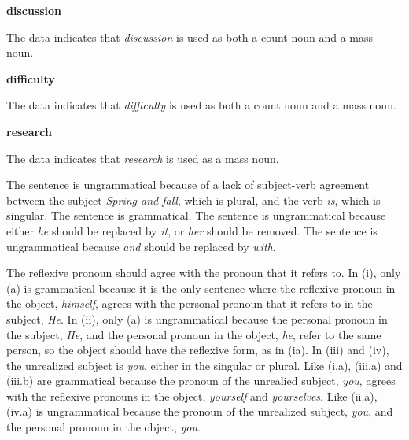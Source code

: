 \documentclass{article}
\begin{document}
\textbf{discussion}
\begin{exe}
\end{exe}
The data indicates that \textit{discussion} is used as both a count noun and a mass noun.

\textbf{difficulty}
\begin{exe}
\end{exe}
The data indicates that \textit{difficulty} is used as both a count noun and a mass noun.

\textbf{research}
\begin{exe}
\end{exe}
The data indicates that \textit{research} is used as a mass noun.
\clearpage

The sentence is ungrammatical because of a lack of subject-verb agreement between the subject \textit{Spring and fall}, which is plural, and the verb \textit{is},  which is singular.
The sentence is grammatical.
The sentence is ungrammatical because either \textit{he} should be replaced by \textit{it}, or \textit{her} should be removed.
The sentence is ungrammatical because \textit{and} should be replaced by \textit{with}.
\clearpage

The reflexive pronoun should agree with the pronoun that it refers to. In (i), only (a) is grammatical because it is the only sentence where the reflexive pronoun in the object, \textit{himself}, agrees with the personal pronoun that it refers to in the subject, \textit{He}. In (ii), only (a) is ungrammatical because the personal pronoun in the subject,  \textit{He}, and the personal pronoun in the object, \textit{he}, refer to the same person, so the object should have the reflexive form, as in (ia). In (iii) and (iv), the unrealized subject is \textit{you}, either in the singular or plural. Like (i.a), (iii.a) and (iii.b) are grammatical because the pronoun of the unrealied subject, \textit{you}, agrees with the reflexive pronouns in the object, \textit{yourself} and \textit{yourselves}. Like (ii.a), (iv.a) is ungrammatical because the pronoun of the unrealized subject, \textit{you}, and the personal pronoun in the object,  \textit{you}.
\clearpage
\end{document}
